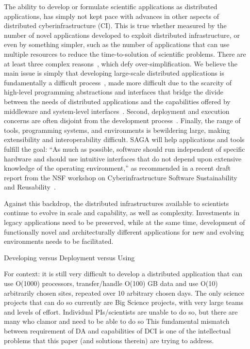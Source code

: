 \documentclass[a4paper,10pt]{article}
\begin{document}
The ability to develop or formulate scientific applications as
distributed applications,
has simply not kept pace with advances in other aspects of distributed
cyberinfrastructure (CI). This is true whether measured by the number
of novel applications developed to exploit distributed infrastructure,
or even by something simpler, such as the number of applications that
can use multiple resources to reduce the time-to-solution of
scientific problems.  There are at least three complex
reasons~\cite{dpa_grid09}, which defy over-simplification. We believe
the main issue is simply that developing large-scale distributed
applications is fundamentally a difficult process~\cite{dpa-paper},
made more difficult due to the scarcity of high-level programming
abstractions and interfaces that bridge the divide between the needs
of distributed applications and the capabilities offered by middleware
and system-level interfaces~\cite{cloud-saga-paper}. Second,
deployment and execution concerns are often disjoint from the
development process~\cite{dpa_grid09}. Finally, the range of tools,
programming systems, and environments is bewildering large, making
extensibility and interoperability difficult.  SAGA will help
applications and tools fulfill the goal: ``As much as possible,
software should run independent of specific hardware and should use
intuitive interfaces that do not depend upon extensive knowledge of
the operating environment,'' as recommended in a recent draft report
from the NSF workshop on Cyberinfrastructure Software Sustainability
and Reusability~\cite{CISSR}.


Against this backdrop, the distributed infrastructures available to
scientists continue to evolve in scale and capability, as well as
complexity.  Investments in legacy applications need to be preserved,
while at the same time, development of functionally novel and
architecturally different applications for new and evolving
environments needs to be facilitated. 

Developing versus Deployment versus Using

For context: it is still very difficult to develop a distributed
application that can use O(1000) processors, transfer/handle O(100) GB
data and use O(10) arbitrarily chosen sites, repeated over 10
arbitrary chosen days. The only science projects that can do so
currently are Big Science projects, with very large teams and levels
of effort.  Individual PIs/scientists are unable to do so, but there
are many who clamor and need to be able to do so This fundamental
mismatch between requirement of DA and capabilities of DCI is one of
the intellectual problems that this paper (and solutions therein) are
trying to address.
\end{document}
